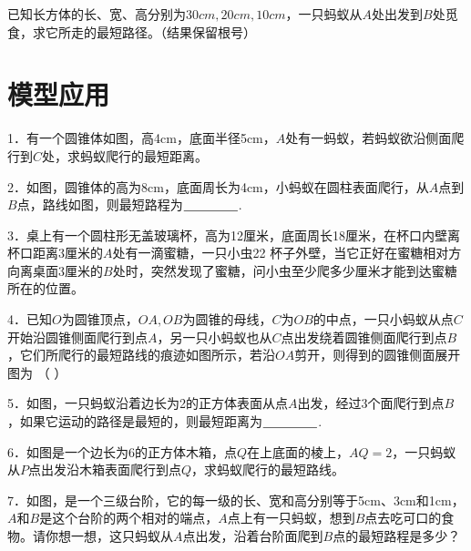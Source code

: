 \documentclass[10pt]{ctexart}
\begin{document}
\begin{shaded}
	\begin{example}
		已知长方体的长、宽、高分别为$30cm,20cm,10cm$，一只蚂蚁从$A$处出发到$B$处觅食，求它所走的最短路径。（结果保留根号）
	\end{example}
\end{shaded}

\section{模型应用}

\begin{shaded}
1．有一个圆锥体如图，高4cm，底面半径5cm，$A$处有一蚂蚁，若蚂蚁欲沿侧面爬行到$C$处，求蚂蚁爬行的最短距离。
\end{shaded}

\begin{shaded}
2．如图，圆锥体的高为8cm，底面周长为4cm，小蚂蚁在圆柱表面爬行，从$A$点到$B$点，路线如图，则最短路程为$\underline{\hspace{1.5cm}}$.
\end{shaded}

\begin{shaded}
3．桌上有一个圆柱形无盖玻璃杯，高为12厘米，底面周长18厘米，在杯口内壁离杯口距离3厘米的$A$处有一滴蜜糖，一只小虫22 杯子外壁，当它正好在蜜糖相对方向离桌面3厘米的$B$处时，突然发现了蜜糖，问小虫至少爬多少厘米才能到达蜜糖所在的位置。
\end{shaded}

\begin{shaded}
	4．已知$O$为圆锥顶点，$OA,OB$为圆锥的母线，$C$为$OB$的中点，一只小蚂蚁从点$C$开始沿圆锥侧面爬行到点$A$，另一只小蚂蚁也从$C$点出发绕着圆锥侧面爬行到点$B$，它们所爬行的最短路线的痕迹如图所示，若沿$OA$剪开，则得到的圆锥侧面展开图为         （    ）
\end{shaded}

\begin{shaded}
	5．如图，一只蚂蚁沿着边长为2的正方体表面从点$A$出发，经过3个面爬行到点$B$，如果它运动的路径是最短的，则最短距离为$\underline{\hspace{1.5cm}}$.
\end{shaded}

\begin{shaded}
6．如图是一个边长为6的正方体木箱，点$Q$在上底面的棱上，$AQ=2$，一只蚂蚁从$P$点出发沿木箱表面爬行到点$Q$，求蚂蚁爬行的最短路线。
\end{shaded}

\begin{shaded}
7．如图，是一个三级台阶，它的每一级的长、宽和高分别等于5cm、3cm和1cm，$A$和$B$是这个台阶的两个相对的端点，$A$点上有一只蚂蚁，想到$B$点去吃可口的食物。请你想一想，这只蚂蚁从$A$点出发，沿着台阶面爬到$B$点的最短路程是多少？
\end{shaded}
\end{document}
